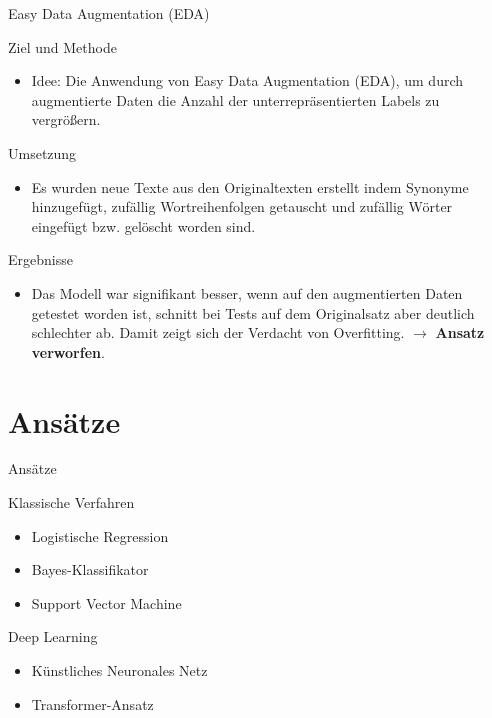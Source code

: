 \documentclass[aspectratio=169]{beamer} %
\begin{document}
\begin{frame}{Easy Data Augmentation (EDA)}
    \begin{block}{Ziel und Methode}
        \begin{itemize}
            \item Idee: Die Anwendung von Easy Data Augmentation (EDA), um durch augmentierte Daten die Anzahl der unterrepräsentierten Labels zu vergrößern.
        \end{itemize}
    \end{block}

    \begin{block}{Umsetzung}
        \begin{itemize}
            \item Es wurden neue Texte aus den Originaltexten erstellt indem Synonyme hinzugefügt, zufällig Wortreihenfolgen getauscht und zufällig Wörter eingefügt bzw. gelöscht worden sind.
        \end{itemize}
    \end{block}

    \begin{block}{Ergebnisse}
        \begin{itemize}
            \item Das Modell war signifikant besser, wenn auf den augmentierten Daten getestet worden ist, schnitt bei Tests auf dem Originalsatz aber deutlich schlechter ab. Damit zeigt sich der Verdacht von Overfitting. $\to$ \textbf{Ansatz verworfen}.
        \end{itemize}
    \end{block}
\end{frame}

\section{Ansätze}

\begin{frame}{Ansätze}
    \begin{block}{Klassische Verfahren}
        \begin{itemize}
            \item Logistische Regression
            \item Bayes-Klassifikator
            \item Support Vector Machine
        \end{itemize}
    \end{block}
    \begin{block}{Deep Learning}
        \begin{itemize}
            \item Künstliches Neuronales Netz
            \item Transformer-Ansatz
        \end{itemize}
    \end{block}
\end{frame}
\end{document}
